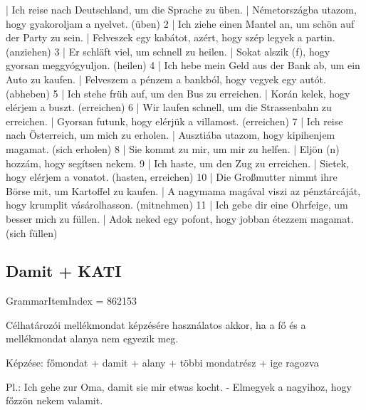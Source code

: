 \documentclass{article}
\newenvironment{desc}{\verbatim}{\endverbatim}
\newenvironment{exmp}{\verbatim}{\endverbatim}
\begin{document}
\begin{exmp}
1 | Ich reise nach Deutschland, um die Sprache zu üben. | Németországba utazom, hogy gyakoroljam a nyelvet. (üben)
2 | Ich ziehe einen Mantel an, um schön auf der Party zu sein. | Felveszek egy kabátot, azért, hogy szép legyek a partin. (anziehen)
3 | Er schläft viel, um schnell zu heilen. | Sokat alszik (f), hogy gyorsan meggyógyuljon. (heilen)
4 | Ich hebe mein Geld aus der Bank ab, um ein Auto zu kaufen. | Felveszem a pénzem a bankból, hogy vegyek egy autót. (abheben)
5 | Ich stehe früh auf, um den Bus zu erreichen. | Korán kelek, hogy elérjem a buszt. (erreichen)
6 | Wir laufen schnell, um die Strassenbahn zu erreichen. | Gyorsan futunk, hogy elérjük a villamost. (erreichen)
7 | Ich reise nach Österreich, um mich zu erholen. | Ausztiába utazom, hogy kipihenjem magamat. (sich erholen)
8 | Sie kommt zu mir, um mir zu helfen. | Eljön (n) hozzám, hogy segítsen nekem.
9 | Ich haste, um den Zug zu erreichen. | Sietek, hogy elérjem a vonatot. (hasten, erreichen)
10 | Die Großmutter nimmt ihre Börse mit, um Kartoffel zu kaufen. | A nagymama magával viszi az pénztárcáját, hogy krumplit vásárolhasson. (mitnehmen)
11 | Ich gebe dir eine Ohrfeige, um besser mich zu füllen. | Adok neked egy pofont, hogy jobban étezzem magamat. (sich füllen)
\end{exmp}

\subsection{Damit + KATI}

GrammarItemIndex = 862153

\begin{desc}
Célhatározói mellékmondat képzésére használatos akkor, ha a fő és a mellékmondat alanya nem egyezik meg.

Képzése:
főmondat + damit + alany + többi mondatrész + ige ragozva

Pl.: Ich gehe zur Oma, damit sie mir etwas kocht. - Elmegyek a nagyihoz, hogy főzzön nekem valamit.
\end{desc}
\end{document}
